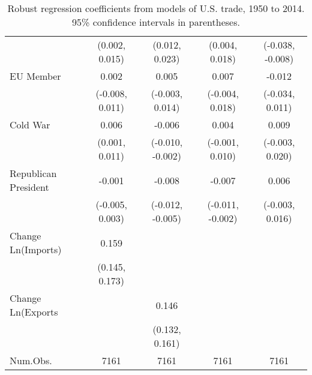 \begin{table}
{\begin{tabular}[t]{lcccc}
 & (0.002, 0.015) & (0.012, 0.023) & (0.004, 0.018) & (-0.038, -0.008)\\
EU Member & 0.002 & 0.005 & 0.007 & -0.012\\
 & (-0.008, 0.011) & (-0.003, 0.014) & (-0.004, 0.018) & (-0.034, 0.011)\\
Cold War & 0.006 & -0.006 & 0.004 & 0.009\\
 & (0.001, 0.011) & (-0.010, -0.002) & (-0.001, 0.010) & (-0.003, 0.020)\\
Republican President & -0.001 & -0.008 & -0.007 & 0.006\\
 & (-0.005, 0.003) & (-0.012, -0.005) & (-0.011, -0.002) & (-0.003, 0.016)\\
Change Ln(Imports) & 0.159 &  &  & \\
 & (0.145, 0.173) &  &  & \\
Change Ln(Exports &  & 0.146 &  & \\
 &  & (0.132, 0.161) &  & \\
\midrule
Num.Obs. & 7161 & 7161 & 7161 & 7161\\
\bottomrule
\end{tabular}
}
\caption{Robust regression coefficients from models of U.S. trade, 1950 to 2014. 95\% confidence intervals in parentheses.}
\label{tab:us-trade-coefs}
\end{table}

